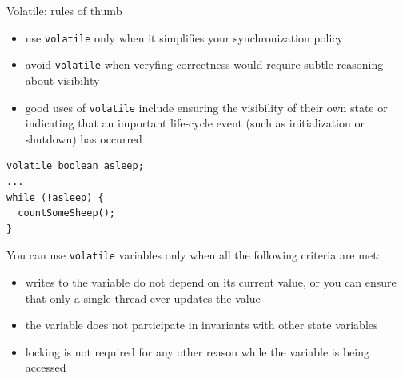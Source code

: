 \begin{frame}[t,fragile]{Volatile: rules of thumb}

\begin{itemize}
  \pause \item use \texttt{volatile} only when it simplifies your synchronization policy
  \pause \item avoid \texttt{volatile} when veryfing correctness would require subtle reasoning about visibility
  \pause \item good uses of \texttt{volatile} include ensuring the visibility of their own state or indicating that an important life-cycle event (such as initialization or shutdown) has occurred
\end{itemize}

\pause
\begin{verbatim}
volatile boolean asleep;
...
while (!asleep) {
  countSomeSheep();
}
\end{verbatim}

\pause
You can use \texttt{volatile} variables only when all the following criteria are met:
\begin{itemize}
  \pause \item writes to the variable do not depend on its current value, or you can ensure that only a single thread ever updates the value
  \pause \item the variable does not participate in invariants with other state variables
  \pause \item locking is not required for any other reason while the variable is being accessed
\end{itemize}

\end{frame}

% 
% 
% 
% 
% 
% 
% 


